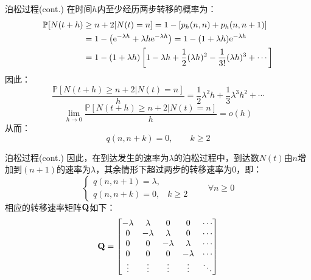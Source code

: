 \documentclass[t]{beamer}
\renewcommand{\Pr}{\mathbb{P}}
\begin{document}
\begin{frame}{泊松过程(cont.)}
  在时间$h$内至少经历两步转移的概率为：
  \[\begin{split}
  \Pr[N(t+h)&\ge n+2|N(t)=n]= 1-[p_h(n,n)+p_h(n,n+1)]
  \\&=1-\left( {\rm e}^{-\lambda h}+\lambda h{\rm e}^{-\lambda h}\right)=1-(1+\lambda h){\rm e}^{-\lambda h}  \\
  &=1-(1+\lambda h)\left[1-\lambda h+\frac{1}{2}(\lambda h)^2-\frac{1}{3!}(\lambda h)^3+\cdots  \right]\\
  \end{split} \]
  因此：
\[\frac{\Pr[N(t+h)\ge n+2|N(t)=n]}{h}=\frac{1}{2}\lambda^2 h+\frac{1}{3}\lambda^3 h^2+\cdots \]
\[\lim_{h\to 0}\frac{\Pr[N(t+h)\ge n+2|N(t)=n]}{h}=o(h) \]
从而：$$q(n,n+k)=0,\qquad k\ge 2$$
\end{frame}

\begin{frame}{泊松过程(cont.)}
  因此，在到达发生的速率为$\lambda$的泊松过程中，到达数$N(t)$由$n$增加到$(n+1)$的速率为$\lambda$，其余情形下超过两步的转移速率为0，即：
  \begin{equation*}
  \begin{cases}
  q(n,n+1)=\lambda,\\
  q(n,n+k)=0, & k\ge 2
  \end{cases}\qquad  \forall n\ge0
  \end{equation*}
  相应的转移速率矩阵${\bf Q}$如下：
  \[{\bf Q}=\begin{bmatrix}
  -\lambda & \lambda & 0& 0& \cdots \\
  0& -\lambda & \lambda&0& \cdots\\
  0&0& -\lambda &\lambda& \cdots \\
  0&0& 0 &-\lambda& \cdots \\
  \vdots & \vdots &\vdots &\vdots&\ddots \\
  \end{bmatrix} \]
\end{frame}
\end{document}
